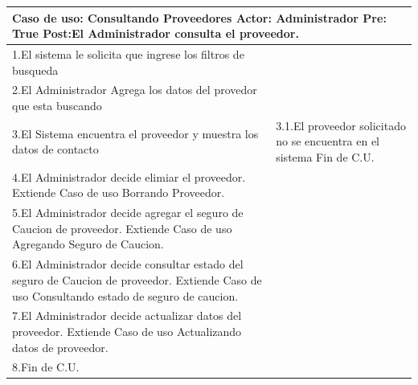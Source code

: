 \begin{longtable}{| p{} | p{} |} 
    \hline
    \multicolumn{2}{|p{16cm}|}{
        \textbf{Caso de uso:} Consultando Proveedores \newline
        \textbf{Actor:} Administrador\newline
        \textbf{Pre:}  True\newline
        \textbf{Post:}El Administrador consulta el proveedor.
    }\\
    \hline
    1.El sistema le solicita que ingrese los filtros de busqueda  & \\
    \hline
    2.El Administrador Agrega los datos del provedor que esta buscando& \\
    \hline
    3.El Sistema encuentra el proveedor y muestra los datos de contacto & 3.1.El proveedor solicitado no se encuentra en el sistema \newline 3.2 Fin de C.U.  \\
    \hline
    4.El Administrador decide elimiar el proveedor. Extiende Caso de uso Borrando Proveedor.& \\
    \hline
    5.El Administrador decide agregar el seguro de Caucion de proveedor. Extiende Caso de uso Agregando Seguro de Caucion.& \\
    \hline
    6.El Administrador decide consultar estado del seguro de Caucion de proveedor. Extiende Caso de uso Consultando estado de seguro de caucion.& \\
    \hline
    7.El Administrador decide actualizar datos del proveedor. Extiende Caso de uso Actualizando datos de proveedor.& \\
    \hline
    8.Fin de C.U.& \\
    \hline
\end{longtable}


